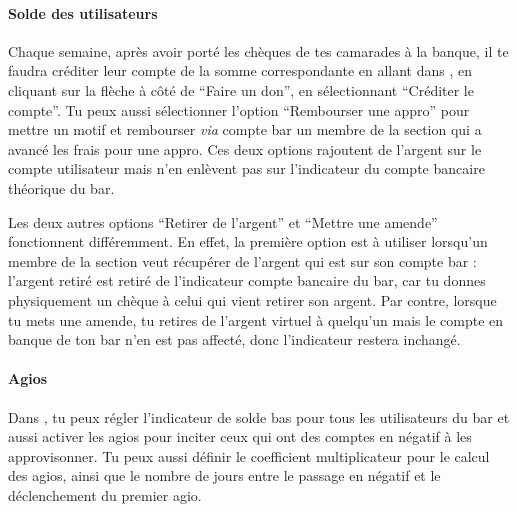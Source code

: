 \documentclass[12pt,french]{article}
\begin{document}
\paragraph{Solde des utilisateurs} Chaque semaine, après avoir porté les chèques de tes camarades à la banque, il te faudra créditer leur compte de la somme correspondante en allant dans , en cliquant sur la flèche à côté de \enquote{Faire un don}, en sélectionnant \enquote{Créditer le compte}. Tu peux aussi sélectionner l'option \enquote{Rembourser une appro} pour mettre un motif et rembourser \emph{via} compte bar un membre de la section qui a avancé les frais pour une appro. Ces deux options rajoutent de l'argent sur le compte utilisateur mais n'en enlèvent pas sur l'indicateur du compte bancaire théorique du bar.

Les deux autres options \enquote{Retirer de l'argent} et \enquote{Mettre une amende} fonctionnent différemment. En effet, la première option est à utiliser lorsqu'un membre de la section veut récupérer de l'argent qui est sur son compte bar : l'argent retiré est retiré de l'indicateur compte bancaire du bar, car tu donnes physiquement un chèque à celui qui vient retirer son argent. Par contre, lorsque tu mets une amende, tu retires de l'argent virtuel à quelqu'un mais le compte en banque de ton bar n'en est pas affecté, donc l'indicateur restera inchangé.

\paragraph{Agios} Dans , tu peux régler l'indicateur de solde bas pour tous les utilisateurs du bar et aussi activer les agios pour inciter ceux qui ont des comptes en négatif à les approvisonner. Tu peux aussi définir le coefficient multiplicateur pour le calcul des agios, ainsi que le nombre de jours entre le passage en négatif et le déclenchement du premier agio.

\end{document}
